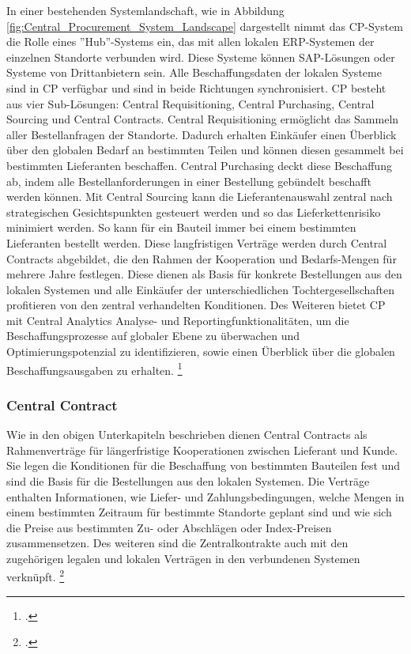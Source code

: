 In einer bestehenden Systemlandschaft, wie in Abbildung \ref{fig:Central_Procurement_System_Landscape} dargestellt nimmt das CP-System die Rolle eines ''Hub''-Systems ein, das mit allen lokalen ERP-Systemen der einzelnen Standorte verbunden wird. Diese Systeme können SAP-Lösungen oder Systeme von Drittanbietern sein. Alle Beschaffungsdaten der lokalen Systeme sind in CP verfügbar und sind in beide Richtungen synchronisiert. CP besteht aus vier Sub-Lösungen: Central Requisitioning, Central Purchasing, Central Sourcing und Central Contracts. Central Requisitioning ermöglicht  das Sammeln aller Bestellanfragen der Standorte. Dadurch erhalten Einkäufer einen Überblick über den globalen Bedarf an bestimmten Teilen und können diesen gesammelt bei bestimmten Lieferanten beschaffen. Central Purchasing deckt diese Beschaffung ab, indem alle Bestellanforderungen in einer Bestellung gebündelt beschafft werden können. Mit Central Sourcing kann die Lieferantenauswahl zentral nach strategischen Gesichtspunkten gesteuert werden und so das Lieferkettenrisiko minimiert werden. So kann \zB für ein Bauteil immer bei einem bestimmten Lieferanten bestellt werden. Diese langfristigen Verträge werden durch Central Contracts abgebildet, die den Rahmen der Kooperation und Bedarfs-Mengen für mehrere Jahre festlegen. Diese dienen als Basis für konkrete Bestellungen aus den lokalen Systemen und alle Einkäufer der unterschiedlichen Tochtergesellschaften profitieren von den zentral verhandelten Konditionen. Des Weiteren bietet CP mit Central Analytics Analyse- und Reportingfunktionalitäten, um die Beschaffungsprozesse auf globaler Ebene zu überwachen und Optimierungspotenzial zu identifizieren, sowie einen Überblick über die globalen Beschaffungsausgaben zu erhalten. \footcite[Vgl.][]{theorie_sap_central_procurement_overview_2024}

\subsubsection{Central Contract} \label{sec:Kapitel23MassChange}

Wie in den obigen Unterkapiteln beschrieben dienen Central Contracts als Rahmenverträge für längerfristige Kooperationen zwischen Lieferant und Kunde. Sie legen die Konditionen für die Beschaffung von bestimmten Bauteilen fest und sind die Basis für die Bestellungen aus den lokalen Systemen. Die Verträge enthalten Informationen, wie \zB Liefer- und Zahlungsbedingungen, welche Mengen in einem bestimmten Zeitraum für bestimmte Standorte geplant sind und wie sich die Preise aus bestimmten Zu- oder Abschlägen oder Index-Preisen zusammensetzen. Des weiteren sind die Zentralkontrakte auch mit den zugehörigen legalen und lokalen Verträgen in den verbundenen Systemen verknüpft. \footcite[Vgl.][]{theorie_sap_central_contract_overview_2024}

